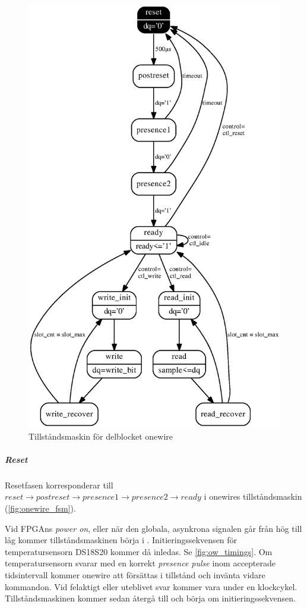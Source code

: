 \begin{figure}[H]
\centering
\includegraphics[height=0.97\textheight]{onewire_fsm.eps}
\caption{Tillståndsmaskin för delblocket onewire}
\label{fig:onewire_fsm}
\end{figure}


\subparagraph{Reset}
Resetfasen korresponderar till $reset\rightarrow postreset\rightarrow presence1\rightarrow presence2\rightarrow ready$ i onewires tillståndsmaskin (\autoref{fig:onewire_fsm}).

Vid FPGAns \emph{power on}, eller när den globala, asynkrona  signalen går från hög till låg kommer tillståndsmaskinen börja i . Initieringssekvensen för temperatursensorn DS18S20 kommer då inledas. Se \autoref{fig:ow_timings}. Om temperatursensorn svarar med en korrekt \emph{presence pulse} inom accepterade tidsintervall kommer onewire att försättas i tillstånd  och invänta vidare kommandon. Vid felaktigt eller uteblivet svar kommer  vara \high{} under en klockcykel. Tillståndsmaskinen kommer sedan återgå till  och börja om initieringssekvensen.

